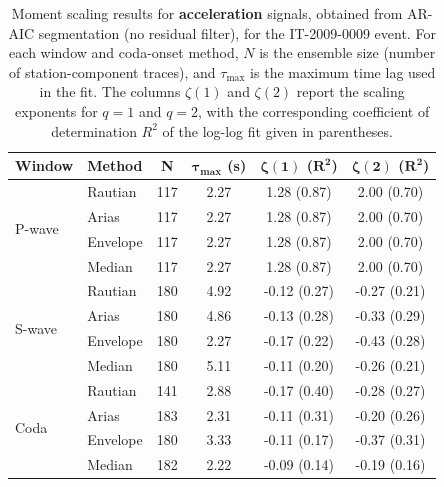 \begin{table}[H]
\centering
\small
\begin{tabular}{llcccc}
\toprule
\textbf{Window} & \textbf{Method} & \textbf{N} & $\bm{\tau_{\max}}$ \textbf{(s)} & $\bm{\zeta(1)}$ \textbf{(}$\bm{R^2}$\textbf{)} & $\bm{\zeta(2)}$ \textbf{(}$\bm{R^2}$\textbf{)} \\
\midrule
\multirow{4}{*}{P-wave}
& Rautian & 117 & 2.27 & 1.28 (0.87) & 2.00 (0.70) \\
& Arias & 117 & 2.27 & 1.28 (0.87) & 2.00 (0.70) \\
& Envelope & 117 & 2.27 & 1.28 (0.87) & 2.00 (0.70) \\
& Median & 117 & 2.27 & 1.28 (0.87) & 2.00 (0.70) \\
\midrule
\multirow{4}{*}{S-wave}
& Rautian & 180 & 4.92 & -0.12 (0.27) & -0.27 (0.21) \\
& Arias & 180 & 4.86 & -0.13 (0.28) & -0.33 (0.29) \\
& Envelope & 180 & 2.27 & -0.17 (0.22) & -0.43 (0.28) \\
& Median & 180 & 5.11 & -0.11 (0.20) & -0.26 (0.21) \\
\midrule
\multirow{4}{*}{Coda}
& Rautian & 141 & 2.88 & -0.17 (0.40) & -0.28 (0.27) \\
& Arias & 183 & 2.31 & -0.11 (0.31) & -0.20 (0.26) \\
& Envelope & 180 & 3.33 & -0.11 (0.17) & -0.37 (0.31) \\
& Median & 182 & 2.22 & -0.09 (0.14) & -0.19 (0.16) \\
\bottomrule
\end{tabular}
\caption{Moment scaling results for \textbf{acceleration} signals, obtained from AR-AIC segmentation (no residual filter), for the IT-2009-0009 event. For each window and coda-onset method, $N$ is the ensemble size (number of station-component traces), and $\tau_{\max}$ is the maximum time lag used in the fit. The columns $\zeta(1)$ and $\zeta(2)$ report the scaling exponents for $q=1$ and $q=2$, with the corresponding coefficient of determination $R^2$ of the log-log fit given in parentheses.}
\label{tab:ar_aic_scaling_acc_nothresh_laquila}
\end{table}